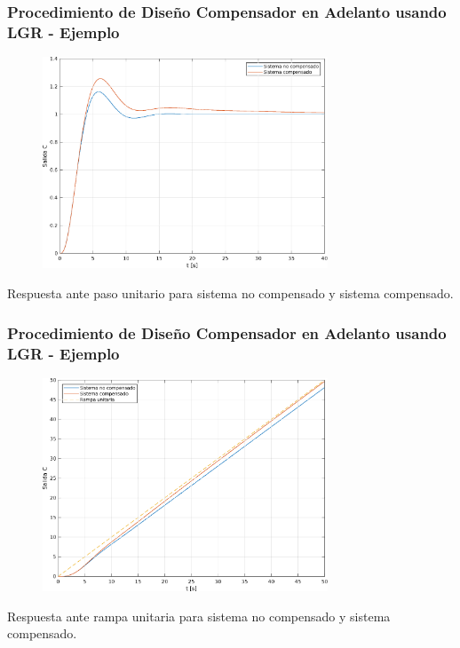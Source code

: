 \documentclass[aspectratio=169,handout]{beamer}
\theoremstyle{definition}
\theoremstyle{plain}
\theoremstyle{remark}
\begin{document}
\begin{frame}[<+->]\frametitle{Procedimiento de Diseño Compensador en Adelanto usando LGR - Ejemplo}
\begin{figure}
	\includegraphics[width=8.5cm]{images/ejemplo2_comparacion_paso.eps}
\end{figure}
\vspace*{-3mm}
\centering \small Respuesta ante paso unitario para sistema no compensado y sistema compensado.
\end{frame}

\begin{frame}[<+->]\frametitle{Procedimiento de Diseño Compensador en Adelanto usando LGR - Ejemplo}
\begin{figure}
	\includegraphics[width=8.5cm]{images/ejemplo2_comparacion_rampa.eps}
\end{figure}
\vspace*{-3mm}
\centering \small Respuesta ante rampa unitaria para sistema no compensado y sistema compensado.
\end{frame}
\end{document}

